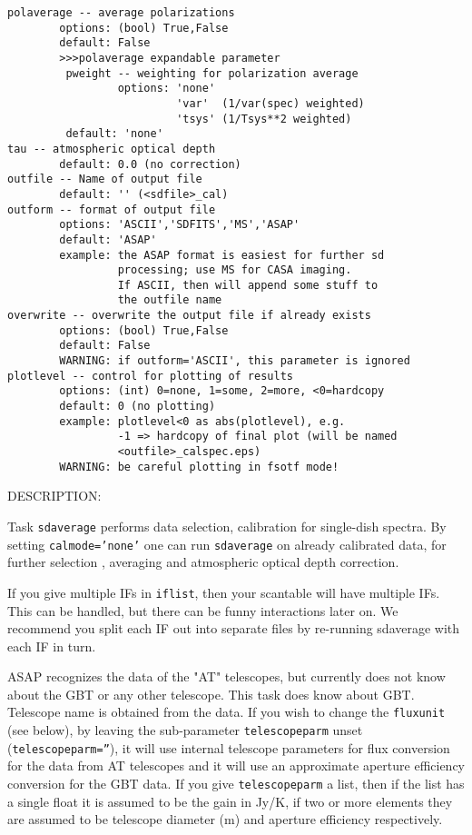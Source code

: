 \begin{verbatim}
polaverage -- average polarizations
        options: (bool) True,False
        default: False
        >>>polaverage expandable parameter
         pweight -- weighting for polarization average
                 options: 'none'
                          'var'  (1/var(spec) weighted)
                          'tsys' (1/Tsys**2 weighted)
         default: 'none'
tau -- atmospheric optical depth
        default: 0.0 (no correction)
outfile -- Name of output file
        default: '' (<sdfile>_cal)
outform -- format of output file
        options: 'ASCII','SDFITS','MS','ASAP'
        default: 'ASAP'
        example: the ASAP format is easiest for further sd
                 processing; use MS for CASA imaging.
                 If ASCII, then will append some stuff to
                 the outfile name
overwrite -- overwrite the output file if already exists
        options: (bool) True,False
        default: False
        WARNING: if outform='ASCII', this parameter is ignored
plotlevel -- control for plotting of results
        options: (int) 0=none, 1=some, 2=more, <0=hardcopy
        default: 0 (no plotting)
        example: plotlevel<0 as abs(plotlevel), e.g.
                 -1 => hardcopy of final plot (will be named
                 <outfile>_calspec.eps)
        WARNING: be careful plotting in fsotf mode!
\end{verbatim}

  DESCRIPTION:

  Task {\tt sdaverage} performs data selection, calibration for single-dish
  spectra.  By setting {\tt calmode='none'}
  one can run {\tt sdaverage} on already calibrated data, for further selection
  , averaging and atmospheric optical depth correction.

  If you give multiple IFs in {\tt iflist}, then your scantable will have
  multiple IFs.  This can be handled, but there can be funny interactions
  later on.  We recommend you split each IF out into separate files
  by re-running sdaverage with each IF in turn.

  ASAP recognizes the data of the "AT" telescopes, but currently
  does not know about the GBT or any other telescope. This task
  does know about GBT. Telescope name is obtained from the data.
  If you wish to change the {\tt fluxunit} (see below), by leaving
  the sub-parameter {\tt telescopeparm} unset ({\tt telescopeparm=''}),
  it will use internal telescope parameters for
  flux conversion for the data from AT telescopes and it will use an
  approximate aperture efficiency conversion for the GBT data.
  If you give {\tt telescopeparm} a list, then if the list has a single float it
  is assumed to be the gain in Jy/K, if two or more elements they are assumed
  to be telescope diameter (m) and aperture efficiency
  respectively.

